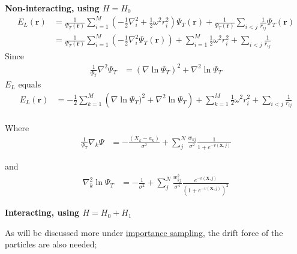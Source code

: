 \documentclass[%
oneside,                 %
final,                   %
10pt]{article}
\begin{document}
\textbf{Non-interacting, using $H=H_0$}
\begin{equation}
\begin{aligned}
E_L(\mathbf{r})&=\frac{1}{\Psi_T(\mathbf{r})}   \sum_{i=1}^{M} \left(  -\frac{1}{2} \nabla_i^2 + \frac{1}{2} \omega^2r_i^2  \right) \Psi_T(\mathbf{r}) + \frac{1}{\Psi_T(\mathbf{r})}  \sum_{i<j}\frac{1}{r_{ij}}  \Psi_T(\mathbf{r}) \\
&=\frac{1}{\Psi_T(\mathbf{r})}   \sum_{i=1}^{M} \left(  -\frac{1}{2} \nabla_i^2 \Psi_T(\mathbf{r})\right) + \sum_{i=1}^{M} \frac{1}{2} \omega^2r_i^2    +  \sum_{i<j}\frac{1}{r_{ij}}  
\end{aligned}
\label{eq:Appendix_rewrite}
\end{equation}
Since
\begin{equation}
\begin{aligned}
\frac{1}{\Psi_T}\nabla^2 \Psi_T & = (\nabla \ln \Psi_T)^2 + \nabla^2 \ln \Psi_T
\end{aligned}
\label{eq:Appendix_rewrite}
\end{equation}
$E_L$ equals
\begin{equation}
\begin{aligned}
E_L(\mathbf{r})
&= -\frac{1}{2}  \sum_{k=1}^{M} \left( \nabla \ln \Psi_T)^2 + \nabla^2 \ln \Psi_T \right) + \sum_{k=1}^{M} \frac{1}{2} \omega^2r_i^2    +  \sum_{i<j}\frac{1}{r_{ij}}  \\
\end{aligned}
\label{eq:Appendix_rewrite}
\end{equation}

Where
\begin{equation}
\begin{aligned}
\frac{1}{\Psi_T} \nabla_k \Psi 
&= - \frac{(X_k - a_k)}{\sigma^2} + \sum_{j}^N \frac{w_{kj}}{\sigma^2}\frac{1}{1 + e^{-v(\bm X,j)}}
\end{aligned}
\label{eq:Appendix_1derivative}
\end{equation}

and
\begin{equation}
\begin{aligned}
\nabla_k^2  \ln \Psi_T 
  &=
 - \frac{1}{\sigma^2} + \sum_{j}^N \frac{w_{kj}^2}{\sigma^4}\frac{e^{-v(\bm X,j)}}{ ( 1 + e^{-v(\bm X,j)} )^2}  
\end{aligned}
\label{eq:Appendix_2derivative}
\end{equation}

\textbf{Interacting, using $H=H_0+H_1$}

As will be discussed more under \hyperref[importance_sampling]{importance sampling}, the drift force of the  particles are also needed;
\end{document}
